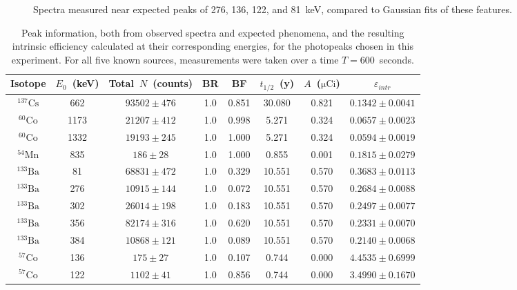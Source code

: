 \documentclass[12pt]{article}
\newcommand{\micCi}{$\mathrm{\mu Ci}$\xspace}
\newcommand{\CsSrc}{$\mathrm{^{137}Cs}$\xspace}
\newcommand{\MnSrc}{$\mathrm{^{54}Mn}$\xspace}
\newcommand{\CoSrcA}{$\mathrm{^{60}Co}$\xspace}
\newcommand{\CoSrcB}{$\mathrm{^{57}Co}$\xspace}
\newcommand{\BaSrc}{$\mathrm{^{133}Ba}$\xspace}
\begin{document}
\begin{figure}
    \centering
    \hfill
    \hfill
    \hfill
    \caption{Spectra measured near expected peaks of 276, 136, 122, and 81~keV, compared to Gaussian fits of these features.}
    \label{fig:peak-fits-b}
\end{figure}


\begin{table}
    \centering
    \caption{Peak information, both from observed spectra and expected phenomena, and the resulting intrinsic efficiency calculated at their corresponding energies, for the photopeaks chosen in this experiment. For all five known sources, measurements were taken over a time $T=600$~seconds.}
    \label{tab:ieffs}
    \begin{tabular}{cc|c|cc|cc|c}\hline
Isotope & $E_0$~(keV) & Total~$N$~(counts) & BR & BF & $t_{1/2}$~(y) & $A$~(\micCi) & $\varepsilon_{intr}$ \\\hline
\rule{0pt}{2.5ex}\CsSrc & 662 & $93502 \pm 476$ & 1.0 & 0.851 & 30.080 & 0.821 & $0.1342 \pm 0.0041$ \\
\CoSrcA & 1173 & $21207 \pm 412$ & 1.0 & 0.998 & 5.271 & 0.324 & $0.0657 \pm 0.0023$ \\
\CoSrcA & 1332 & $19193 \pm 245$ & 1.0 & 1.000 & 5.271 & 0.324 & $0.0594 \pm 0.0019$ \\
\MnSrc & 835 & $186 \pm 28$ & 1.0 & 1.000 & 0.855 & 0.001 & $0.1815 \pm 0.0279$ \\
\BaSrc & 81 & $68831 \pm 472$ & 1.0 & 0.329 & 10.551 & 0.570 & $0.3683 \pm 0.0113$ \\
\BaSrc & 276 & $10915 \pm 144$ & 1.0 & 0.072 & 10.551 & 0.570 & $0.2684 \pm 0.0088$ \\
\BaSrc & 302 & $26014 \pm 198$ & 1.0 & 0.183 & 10.551 & 0.570 & $0.2497 \pm 0.0077$ \\
\BaSrc & 356 & $82174 \pm 316$ & 1.0 & 0.620 & 10.551 & 0.570 & $0.2331 \pm 0.0070$ \\
\BaSrc & 384 & $10868 \pm 121$ & 1.0 & 0.089 & 10.551 & 0.570 & $0.2140 \pm 0.0068$ \\
\CoSrcB & 136 & $175 \pm 27$ & 1.0 & 0.107 & 0.744 & 0.000 & $4.4535 \pm 0.6999$ \\
\CoSrcB & 122 & $1102 \pm 41$ & 1.0 & 0.856 & 0.744 & 0.000 & $3.4990 \pm 0.1670$ \\\hline
    \end{tabular}
\end{table}
\end{document}
